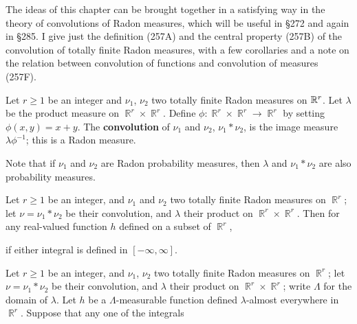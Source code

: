  
\def\chaptername{Product measures} 
\def\sectionname{Convolutions of measures} 
 
 
The ideas of this chapter can be brought together in a satisfying way in 
the theory of convolutions of Radon measures, 
which will be useful in \S272 and again in 
\S285.   I give just the definition (257A) and the central property 
(257B) of the convolution of totally finite Radon measures, with a few 
corollaries and a note on the relation between convolution of functions 
and convolution of measures (257F). 
 
  Let $r\ge 1$ be an 
integer and $\nu_1$, $\nu_2$ two totally finite Radon measures on 
$\Bbb R^r$.   Let $\lambda$ be the product measure on 
$\BbbR^r\times\BbbR^r$.   Define 
$\phi:\BbbR^r\times\BbbR^r\to\BbbR^r$ by setting 
$\phi(x,y)=x+y$.   The {\bf convolution} 
of $\nu_1$ and $\nu_2$, $\nu_1*\nu_2$, is the image measure 
$\lambda\phi^{-1}$;   this is a Radon measure. 
 
Note that if $\nu_1$ and $\nu_2$ are Radon probability measures, then 
$\lambda$ and $\nu_1*\nu_2$ are also probability measures. 
 
 Let $r\ge 1$ be an integer, and $\nu_1$ and 
$\nu_2$ two totally finite Radon measures on $\BbbR^r$;  let 
$\nu=\nu_1*\nu_2$ be their convolution, and $\lambda$ their product on 
$\BbbR^r\times\BbbR^r$.   Then for any real-valued function $h$ defined 
on a subset of $\BbbR^r$, 
 
 
\noindent if either integral is defined in $[-\infty,\infty]$. 
 
 
 Let $r\ge 1$ be an integer, and $\nu_1$, 
$\nu_2$ two totally finite Radon measures on $\BbbR^r$;  let 
$\nu=\nu_1*\nu_2$ be their convolution, and $\lambda$ their product on 
$\BbbR^r\times\BbbR^r$;  write $\Lambda$ for the domain of $\lambda$. 
Let $h$ be a $\Lambda$-measurable function 
defined $\lambda$-almost everywhere in $\BbbR^r$.     Suppose that any 
one of the integrals 
 
